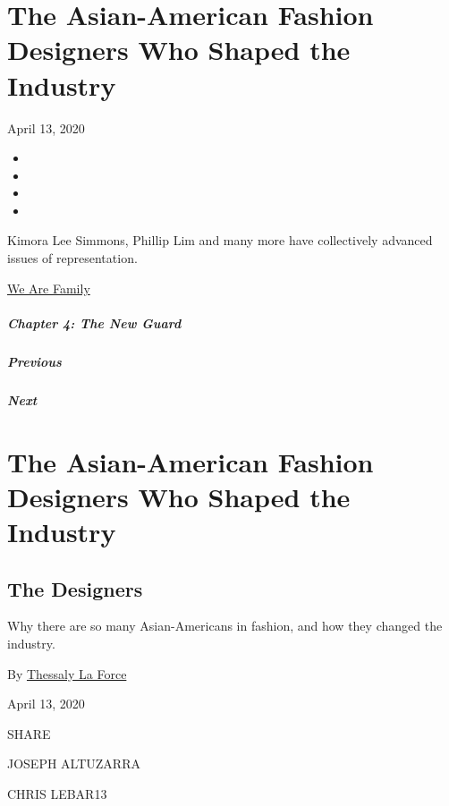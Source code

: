 \hypertarget{the-asian-american-fashion-designers-who-shaped-the-industry}{%
\section{The Asian-American Fashion Designers Who Shaped the
Industry}\label{the-asian-american-fashion-designers-who-shaped-the-industry}}

April 13, 2020

\begin{itemize}
\item
\item
\item
\item
\end{itemize}

Kimora Lee Simmons, Phillip Lim and many more have collectively advanced
issues of representation.

\href{https://www.nytimes3xbfgragh.onion/interactive/2020/04/13/t-magazine/culture-issue-2020.html}{We
Are Family}

\hypertarget{chapter-4-the-new-guard}{%
\subparagraph{Chapter 4: The New Guard}\label{chapter-4-the-new-guard}}

\hypertarget{previous}{%
\subparagraph{Previous}\label{previous}}

\hypertarget{next}{%
\subparagraph{Next}\label{next}}

\hypertarget{the-asian-american-fashion-designers-who-shaped-the-industry-1}{%
\section{The Asian-American Fashion Designers Who Shaped the
Industry}\label{the-asian-american-fashion-designers-who-shaped-the-industry-1}}

\hypertarget{the-designers}{%
\subsection{The Designers}\label{the-designers}}

Why there are so many Asian-Americans in fashion, and how they changed
the industry.

By
\href{https://www.nytimes3xbfgragh.onion/by/thessaly-la-force}{Thessaly
La Force}

April 13, 2020

SHARE

JOSEPH ALTUZARRA

CHRIS LEBAR13

